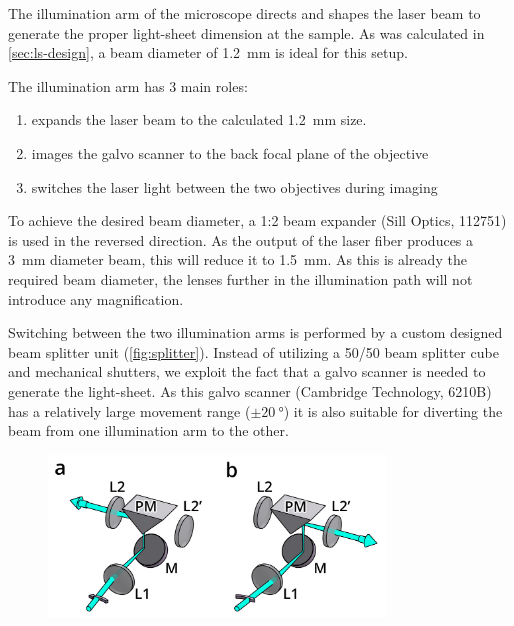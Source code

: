     The illumination arm of the microscope directs and shapes the laser beam to generate the proper light-sheet dimension at the sample. As was calculated in \autoref{sec:ls-design}, a beam diameter of \SI{1.2}{mm} is ideal for this setup.

    The illumination arm has 3 main roles:
    \begin{enumerate}
      \item expands the laser beam to the calculated \SI{1.2}{mm} size.
      \item images the galvo scanner to the back focal plane of the objective
      \item switches the laser light between the two objectives during imaging
    \end{enumerate}

    To achieve the desired beam diameter, a 1:2 beam expander (Sill Optics, 112751) is used in the reversed direction. As the output of the laser fiber produces a \SI{3}{mm} diameter beam, this will reduce it to \SI{1.5}{mm}. As this is already the required beam diameter, the lenses further in the illumination path will not introduce any magnification.
    
    \label{sec:splitter}

    Switching between the two illumination arms is performed by a custom designed beam splitter unit (\autoref{fig:splitter}). Instead of utilizing a 50/50 beam splitter cube and mechanical shutters, we exploit the fact that a galvo scanner is needed to generate the light-sheet. As this galvo scanner (Cambridge Technology, 6210B) has a relatively large movement range ($\pm \SI{20}{\degree}$) it is also suitable for diverting the beam from one illumination arm to the other.

    \begin{figure}[h]
      \centering
      \includegraphics[width=0.8\textwidth]{SW/splitterFigure}
      \label{fig:splitter}
    \end{figure}

